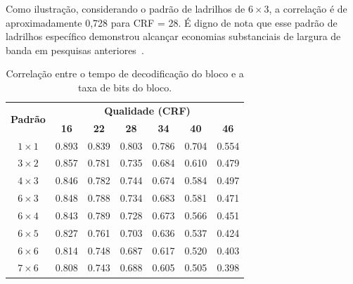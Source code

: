 {Como ilustração, considerando o padrão de ladrilhos de $6 \times 3$, a correlação é de aproximadamente 0,728 para CRF = 28. É digno de nota que esse padrão de ladrilhos específico demonstrou alcançar economias substanciais de largura de banda em pesquisas anteriores~\cite{Graf2017}.

\begin{table}[htb]
        \footnotesize
        \caption{Correlação entre o tempo de decodificação do bloco e a taxa de bits do bloco.}
        \label{tab:corr_list}
        \begin{center}
                \begin{tabular}{|c|c|c|c|c|c|c|}
                        \hline
                        \multirow{2}{*}{\textbf{Padrão}} & \multicolumn{6}{c|}{\bf Qualidade (CRF)} \\
                        \cline{2-7}
                        & \textbf{16} & \textbf{22} & \textbf{28} & \textbf{34} & \textbf{40} & \textbf{46} \\
                        \hline
                        $1\times 1$ & 0.893 & 0.839 & 0.803 & 0.786 & 0.704 & 0.554 \\
                        \hline
                        $3\times 2$ & 0.857 & 0.781 & 0.735 & 0.684 & 0.610 & 0.479 \\
                        \hline
                        $4\times 3$ & 0.846 & 0.782 & 0.744 & 0.674 & 0.584 & 0.497 \\
                        \hline
                        $6\times 3$ & 0.848 & 0.788 & 0.734 & 0.683 & 0.581 & 0.471 \\
                        \hline
                        $6\times 4$ & 0.843 & 0.789 & 0.728 & 0.673 & 0.566 & 0.451 \\
                        \hline
                        $6\times 5$ & 0.827 & 0.761 & 0.703 & 0.636 & 0.537 & 0.424 \\
                        \hline
                        $6\times 6$ & 0.814 & 0.748 & 0.687 & 0.617 & 0.520 & 0.403 \\
                        \hline
                        $7\times 6$ & 0.808 & 0.743 & 0.688 & 0.605 & 0.505 & 0.398 \\
                        \hline
                \end{tabular}
        \end{center}
\end{table}

}
